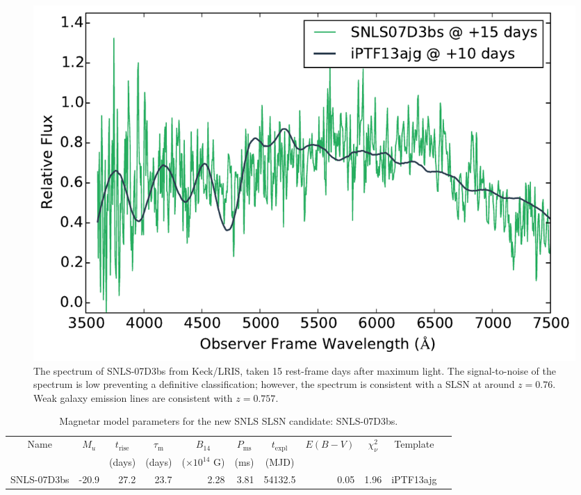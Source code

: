 \begin{figure}
\centering
\includegraphics[scale=0.5]{Figures/Chapter3/07D3bsSpec}
\caption{The spectrum of SNLS-07D3bs from Keck/LRIS, taken 15 rest-frame days after maximum light. The signal-to-noise of the spectrum is low preventing a definitive classification; however, the spectrum is consistent with a SLSN at around $z=0.76$. Weak galaxy emission lines are consistent with $z=0.757$.}
\label{fig:07D3bsSpec}
\end{figure}

\begin{table}
\begin{center}
\caption{Magnetar model parameters for the new SNLS SLSN candidate: SNLS-07D3bs.}
\label{tab:07d3bsParams}
\begin{tabular}{|l|r|r|r|r|r|r|r|r|r|r|}
\hline
  \multicolumn{1}{|c|}{Name} &
  \multicolumn{1}{c|}{$M_u$} &
  \multicolumn{1}{c|}{$t_\mathrm{rise}$} &
  \multicolumn{1}{c|}{$\tau_\mathrm{m}$} &
  \multicolumn{1}{c|}{$B_{14}$} &
  \multicolumn{1}{c|}{$P_{\mathrm{ms}}$} &
  \multicolumn{1}{c|}{$t_\mathrm{expl}$} &
  \multicolumn{1}{c|}{$E(B-V)$} &
  \multicolumn{1}{c|}{$\chi^2_{\nu}$} &
  \multicolumn{1}{c|}{Template} \\ & &
  \multicolumn{1}{c|}{(days)} &
  \multicolumn{1}{c|}{(days)} &
  \multicolumn{1}{c|}{($\times10^{14}$ G)} &
  \multicolumn{1}{c|}{(ms)} &
  \multicolumn{1}{c|}{(MJD)} & \\
\hline
SNLS-07D3bs & -20.9 &  27.2 & 23.7 & 2.28 & 3.81 & 54132.5 & 0.05 & 1.96 & iPTF13ajg\\
\hline
\end{tabular}
\end{center}
\end{table}
